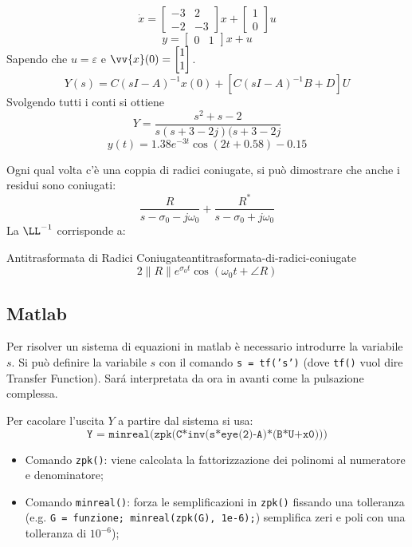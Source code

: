 \documentclass[12pt]{article}
\begin{document}
\begin{example}{}{}
    \[ \dot{x} = \begin{bmatrix} -3 & 2 \\ -2 & -3 \end{bmatrix}x + \begin{bmatrix} 1 \\ 0 \end{bmatrix} u \]
    \[ y = \begin{bmatrix} 0 & 1 \end{bmatrix}x + u \]
    Sapendo che $u = \varepsilon$ e $\vv{x}(0) = \begin{bmatrix} 1 \\ 1 \end{bmatrix} $.
    \[ Y(s) = C(sI-A)^{-1}x(0) + [C(sI-A)^{-1}B + D]U \]
    Svolgendo tutti i conti si ottiene
    \[ Y = \frac{s^{2}+s-2}{s(s+3-2j)(s+3-2j}  \]
    \[ y(t) = 1.38e^{-3t}\cos(2t+0.58)-0.15 \]
\end{example}
Ogni qual volta c'\`e una coppia di radici coniugate, si pu\`o dimostrare che anche i residui sono coniugati:
\[ \frac{R}{s-\sigma_0 -j\omega_0}  + \frac{R^{*}}{s-\sigma_0 +j\omega_0}  \]
La $\LL^{-1}$ corrisponde a:
\begin{definition}{Antitrasformata di Radici Coniugate}{antitrasformata-di-radici-coniugate}
    \[ 2\|R\| e^{\sigma_0t} \cos(\omega_0t + \angle R) \]
\end{definition}


\subsection{Matlab}
Per risolver un sistema di equazioni in matlab \`e necessario introdurre la variabile $s$. Si pu\`o definire la variabile $s$ con il comando \texttt{s = tf('s')} (dove \texttt{tf()} vuol dire Transfer Function). Sar\'a interpretata da ora in avanti come la pulsazione complessa.

Per cacolare l'uscita $Y$ a partire dal sistema si usa: 
\[ \texttt{Y = minreal(zpk(C*inv(s*eye(2)-A)*(B*U+x0)))} \]

\begin{itemize}
    \item Comando \texttt{zpk()}: viene calcolata la fattorizzazione dei polinomi al numeratore e denominatore;
    \item Comando \texttt{minreal()}: forza le semplificazioni in \texttt{zpk()} fissando una tolleranza (e.g. \texttt{G = funzione; minreal(zpk(G), 1e-6);}) semplifica zeri e poli con una tolleranza di $10^{-6}$);
\end{itemize}
\end{document}
